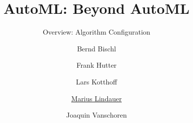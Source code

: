 


\title[AutoML: AC]{AutoML: Beyond AutoML}
\subtitle{Overview: Algorithm Configuration}
\author[Marius Lindauer]{Bernd Bischl \and Frank Hutter \and Lars Kotthoff\newline \and \underline{Marius Lindauer} \and Joaquin Vanschoren}
\institute{}
\date{}




	
	\maketitle
	

